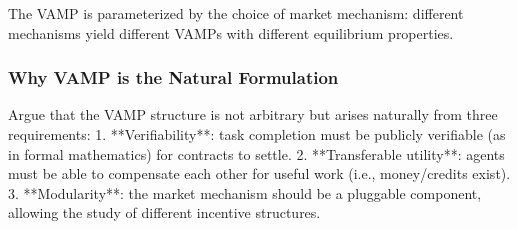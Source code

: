 The VAMP is parameterized by the choice of market mechanism: different mechanisms yield different VAMPs with different equilibrium properties.

\subsubsection{Why VAMP is the Natural Formulation}
Argue that the VAMP structure is not arbitrary but arises naturally from three requirements:
1. **Verifiability**: task completion must be publicly verifiable (as in formal mathematics) for contracts to settle.
2. **Transferable utility**: agents must be able to compensate each other for useful work (i.e., money/credits exist).
3. **Modularity**: the market mechanism should be a pluggable component, allowing the study of different incentive structures.
